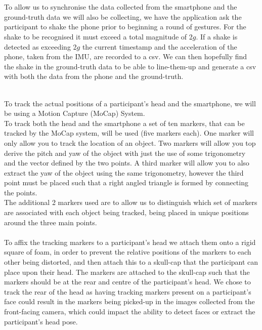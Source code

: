 \\\\
To allow us to synchronise the data collected from the smartphone and the ground-truth data we will also be collecting, we have the application ask the participant to shake the phone prior to beginning a round of gestures. For the shake to be recognised it must exceed a total magnitude of 2$g$. If a shake is detected as exceeding 2$g$ the current timestamp and the acceleration of the phone, taken from the IMU, are recorded to a csv. We can then hopefully find the shake in the ground-truth data to be able to line-them-up and generate a csv with both the data from the phone and the ground-truth.

\nl{}\\
To track the actual positions of a participant's head and the smartphone, we will be using a Motion Capture (MoCap) System.
\nl{}\\
To track both the head and the smartphone a set of ten markers, that can be tracked by the MoCap system, will be used (five markers each).
One marker will only allow you to track the location of an object. Two markers will allow you top derive the pitch and yaw of the object with just the use of some trigonometry and the vector defined by the two points. A third marker will allow you to also extract the yaw of the object using the same trigonometry, however the third point must be placed such that a right angled triangle is formed by connecting the points.
\nl{}\\
The additional 2 markers used are to allow us to distinguish which set of markers are associated with each object being tracked, being placed in unique positions around the three main points.
\\\\
To affix the tracking markers to a participant's head we attach them onto a rigid square of foam, in order to prevent the relative positions of the markers to each other being distorted, and then attach this to a skull-cap that the participant can place upon their head.
The markers are attached to the skull-cap such that the markers should be at the rear and centre of the participant's head. 
We chose to track the rear of the head as having tracking markers present on a participant's face could result in the markers being picked-up in the images collected from the front-facing camera, which could impact the ability to detect faces or extract the participant's head pose.
\nl{}

